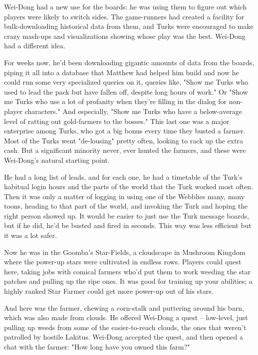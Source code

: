 Wei-Dong had a new use for the boards: he was using them to figure
out which players were likely to switch sides. The game-runners had
created a facility for bulk-downloading historical data from them,
and Turks were encouraged to make crazy mash-ups and visualizations
showing whose play was the best. Wei-Dong had a different idea.

For weeks now, he'd been downloading gigantic amounts of data from
the boards, piping it all into a database that Matthew had helped
him build and now he could run some very specialized queries on it,
queries like, "Show me Turks who used to lead the pack but have
fallen off, despite long hours of work." Or "Show me Turks who use
a lot of profanity when they're filling in the dialog for
non-player characters." And especially, "Show me Turks who have a
below-average level of ratting out gold-farmers to the bosses."
This last one was a major enterprise among Turks, who got a big
bonus every time they busted a farmer. Most of the Turks went
"de-lousing" pretty often, looking to rack up the extra cash. But a
significant minority never, ever hunted the farmers, and these were
Wei-Dong's natural starting point.

He had a long list of leads, and for each one, he had a timetable
of the Turk's habitual login hours and the parts of the world that
the Turk worked most often. Then it was only a matter of logging in
using one of the Webblies many, many toons, heading to that part of
the world, and invoking the Turk and hoping the right person showed
up. It would be easier to just use the Turk message boards, but if
he did, he'd be busted and fired in seconds. This way was less
efficient but it was a lot safer.

Now he was in the Goomba's Star-Fields, a cloudscape in Mushroom
Kingdom where the power-up stars were cultivated in endless rows.
Players could quest here, taking jobs with comical farmers who'd
put them to work weeding the star patches and pulling up the ripe
ones. It was good for training up your abilities; a highly ranked
Star Farmer could get more power-up out of his stars.

And here was the farmer, chewing a corn-stalk and puttering around
his barn, which was also made from clouds. He offered Wei-Dong a
quest -- low-level, just pulling up weeds from some of the
easier-to-reach clouds, the ones that weren't patrolled by hostile
Lakitus. Wei-Dong accepted the quest, and then opened a chat with
the farmer: "How long have you owned this farm?"

